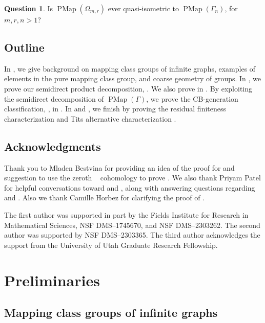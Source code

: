 \documentclass[11pt]{amsart}
\theoremstyle{plain}
\theoremstyle{definition}
\newtheorem{Q}[THM]{Question}
\DeclareMathOperator{\PMap}{PMap}
\def\G{{\Gamma}}
\newcommand{\<}{\langle}
\renewcommand{\>}{\rangle}
\newcommand{\cech}{\text{{\v C}ech}}
\begin{document}
\begin{Q}
    Is $\PMap(\Omega_{m,r})$ ever quasi-isometric to $\PMap(\G_{n})$, for $m,r,n>1$? 
\end{Q} 

\subsection*{Outline} In , we give background on mapping class groups of infinite graphs, examples of elements in the pure mapping class group, and coarse geometry of groups. In , we prove our semidirect product decomposition, . We also prove  in . By exploiting the semidirect decomposition of $\PMap(\G)$, we prove the CB-generation classification, , in . In  and , we finish by proving the residual finiteness characterization  and Tits alternative characterization .


\subsection*{Acknowledgments}

Thank you to Mladen Bestvina for providing an idea of the proof for  and suggestion to use the zeroth \cech~ cohomology to prove . We also thank Priyam Patel for helpful conversations toward  and , along with answering questions regarding \cite{PatelVlamis} and \cite{APV2020}. Also we thank Camille Horbez for clarifying the proof of . 

The first author was supported in part by the Fields Institute for Research in Mathematical Sciences, NSF DMS--1745670, and NSF DMS--2303262. The second author was supported by NSF DMS--2303365. The third author acknowledges the support from the University of Utah Graduate Research Fellowship. 

\tableofcontents 

\section{Preliminaries}\label{sec:prelims}

\subsection{Mapping class groups of infinite graphs}
\end{document}
